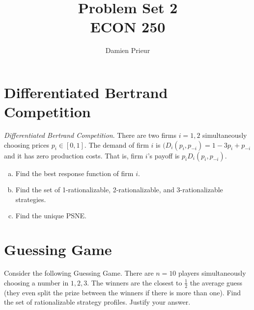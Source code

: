 \documentclass{article}
\author{Damien Prieur}
\title{Problem Set 2 \\ ECON 250}
\date{}
\begin{document}
\maketitle

\section{Differentiated Bertrand Competition}
\emph{Differentiated Bertrand Competition}.
There are two firms $i = 1, 2$ simultaneously choosing prices $p_{i} \in [0,1]$.
The demand of firm $i$ is $(D_{i}(p_{i},p_{-i})= 1-3p_{i} + p_{-i}$ and it has zero production costs.
That is, firm $i$'s payoff is $p_{i}D_{i}(p_{i},p_{-i})$.

\begin{enumerate}[(a)]

\item Find the best response function of firm $i$.
\newline

\item Find the set of 1-rationalizable, 2-rationalizable, and 3-rationalizable strategies.
\newline

\item Find the unique PSNE.
\newline

\end{enumerate}

\section{Guessing Game}
Consider the following Guessing Game.
There are $n = 10$ players simultaneously choosing a number in ${1,2,3}$.
The winners are the closest to $\frac{1}{2}$ the average guess (they even split the prize between the winners if there is more than one).
Find the set of rationalizable strategy profiles. Justify your answer.
\end{document}
